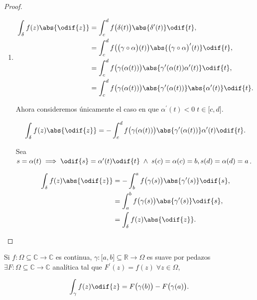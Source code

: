 \documentclass[../main.tex]{subfiles}
\begin{document}
\begin{proof}
\begin{enumerate}[label=(\roman*), start=2]
		\item

		      \begin{align*}
			      \int_{\delta}^{}f(z)\abs{\odif{z}} & = \int_{c}^{d}f
			      \bigl(\delta(t)\bigr) \abs{\delta^{\prime}(t)}\odif{t},                                  \\
			                                         & = \int_{c}^{d}f
			      \bigl(\bigl(\gamma \circ
				      \alpha\bigr)(t)\bigr)\abs{\bigl(\gamma
				      \circ
			      \alpha\bigr)^{\prime}(t)}\odif{t},                                                       \\
			                                         & = \int_{c}^{d}f
			      \bigl(\gamma(\alpha(t))\bigr)\abs{\gamma^{\prime}(\alpha(t))\alpha^{\prime}(t)}\odif{t}, \\
			                                         & = \int_{c}^{d}f
			      \bigl(\gamma(\alpha(t))\bigr)\abs{\gamma^{\prime}(\alpha(t))}\abs{\alpha^{\prime}(t)}\odif{t}.
		      \end{align*}

		      Ahora consideremos únicamente el caso en que \(\alpha^{\prime}(t) < 0\;
		      t\in \bigl[c, d\bigr]\).

		      \begin{equation*}
			      \int_{\delta}^{}f(z)\abs{\odif{z}} = - \int_{c}^{d}f
			      \bigl(\gamma(\alpha(t))\bigr)\abs{\gamma^{\prime}(\alpha(t))}\alpha^{\prime}(t)\odif{t}.
		      \end{equation*}

		      Sea \(s = \alpha(t) \implies \odif{s} = \alpha^{\prime}(t) \odif{t}\; \wedge \; s(c) =
		      \alpha(c) = b, s(d) = \alpha(d) = a\).

		      \begin{align*}
			      \int_{\delta}^{}f(z)\abs{\odif{z}} & = - \int_{b}^{a}f
			      \bigl(\gamma(s)\bigr)\abs{\gamma^{\prime}(s)}\odif{s},                     \\
			                                         & = \int_{a}^{b}f
			      \bigl(\gamma(s)\bigr)\abs{\gamma^{\prime}(s)}\odif{s},                     \\
			                                         & = \int_{\delta}^{}f(z)\abs{\odif{z}}.
		      \end{align*}
	\end{enumerate}
\end{proof}

\begin{proposition}
	Si \(f \colon \Omega \subseteq \mathbb{C} \to \mathbb{C}\) es continua, \(\gamma
	\colon  \bigl[a, b\bigr] \subseteq \mathbb{R} \to \Omega\) es suave por pedazos
	\(\exists F \colon \Omega \subseteq \mathbb{C} \to \mathbb{C}\) analítica tal que
	\(F^{\prime}(z) = f(z)\; \forall z\in\Omega\),

	\begin{equation*}
		\int_{\gamma}^{}f(z)\odif{z} = F \bigl(\gamma(b)\bigr) - F \bigl(\gamma(a)\bigr).
	\end{equation*}
\end{proposition}
\end{document}
